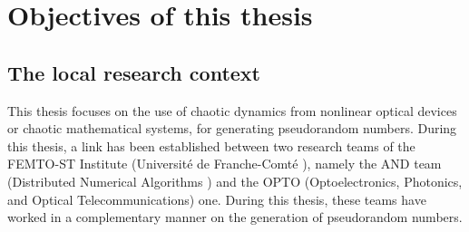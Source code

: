 \section{Objectives of this thesis}

\subsection{The local research context}

This thesis focuses on the use of chaotic dynamics from nonlinear optical devices or chaotic mathematical systems, for generating pseudorandom numbers. 
During this thesis, a link has been established between two research teams of the
FEMTO-ST Institute  
(Universit\'{e} de Franche-Comt\'{e}%
), namely the AND team 
(Distributed Numerical Algorithms%
) and the OPTO (Optoelectronics, Photonics, and Optical Telecommunications) one. 
During this thesis, these teams have worked in a complementary manner on the generation of pseudorandom numbers. 

